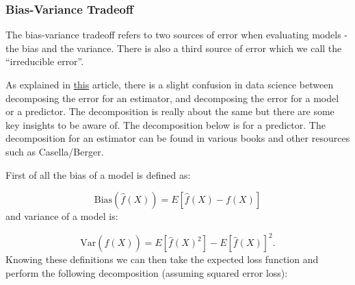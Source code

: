 \documentclass[paper=a4, fontsize=11pt]{scrartcl} %
\numberwithin{equation}{section} %
\numberwithin{figure}{section} %
\numberwithin{table}{section} %
\begin{document}
\subsubsection{Bias-Variance Tradeoff}

The bias-variance tradeoff refers to two sources of error when evaluating models - the bias and the variance. There is also a third source of error which we call the ``irreducible error''. 

As explained in \href{https://towardsdatascience.com/mse-and-bias-variance-decomposition-77449dd2ff55}{this} article, there is a slight confusion in data science between decomposing the error for an \gls{estimator}, and decomposing the error for a model or a predictor. The decomposition is really about the same but there are some key insights to be aware of. The decomposition below is for a predictor. The decomposition for an estimator can be found in various books and other resources such as Casella/Berger. 

First of all the bias of a model is defined as:

\begin{equation}
\text{Bias}\left(\hat{f}(X)\right) = E \left[\hat{f}(X) - f(X)\right]
\end{equation}
and variance of a model is:

\begin{equation}
\text{Var}\left(\hat{f}(X)\right) = E \left[\hat{f}(X)^2\right] - E \left[\hat{f}(X)\right]^2. 
\end{equation}
Knowing these definitions we can then take the expected loss function and perform the following decomposition (assuming squared error loss):
\end{document}
